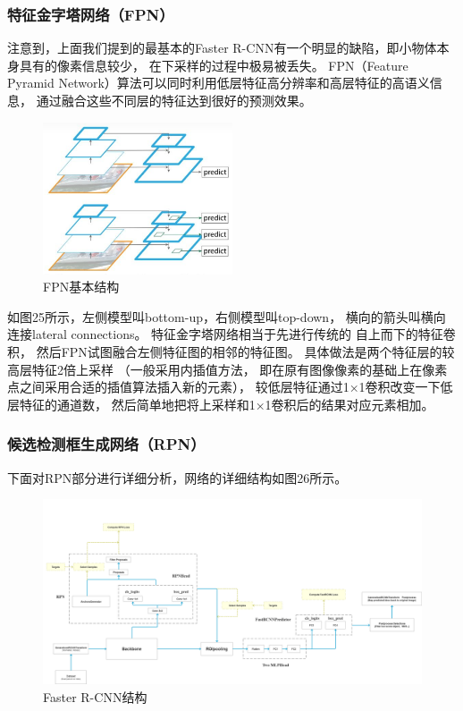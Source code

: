 \documentclass[UTF8]{ctexart}
\begin{document}
\subsubsection{特征金字塔网络（FPN）}
注意到，上面我们提到的最基本的Faster R-CNN有一个明显的缺陷，即小物体本身具有的像素信息较少，
在下采样的过程中极易被丢失。
FPN（Feature Pyramid Network）算法可以同时利用低层特征高分辨率和高层特征的高语义信息，
通过融合这些不同层的特征达到很好的预测效果。

\begin{figure}[h]
    \centering
    \includegraphics[width=0.50\textwidth]{../img/FPN.png}
    \caption{FPN基本结构}
\end{figure}

如图25所示，左侧模型叫bottom-up，右侧模型叫top-down，
横向的箭头叫横向连接lateral connections。
特征金字塔网络相当于先进行传统的
自上而下的特征卷积，
然后FPN试图融合左侧特征图的相邻的特征图。
具体做法是两个特征层的较高层特征2倍上采样
（一般采用内插值方法，
即在原有图像像素的基础上在像素点之间采用合适的插值算法插入新的元素），
较低层特征通过1×1卷积改变一下低层特征的通道数，
然后简单地把将上采样和1×1卷积后的结果对应元素相加。

\subsubsection{候选检测框生成网络（RPN）}
下面对RPN部分进行详细分析，网络的详细结构如图26所示。

\begin{figure}[htbp]
    \centering
    \includegraphics[width=1.00\textwidth]{../img/fasterR-CNN_details.png}
    \caption{Faster R-CNN结构}
\end{figure}
\end{document}
